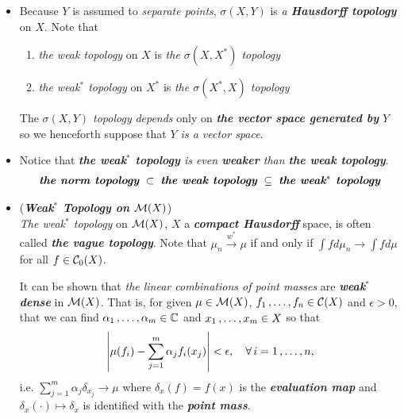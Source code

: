 \documentclass[11pt]{article}
\begin{document}
\begin{itemize}
\item \begin{remark}
Because $Y$ is assumed to \emph{separate points}, $\sigma(X, Y)$ is \emph{a \textbf{Hausdorff topology}} on $X$.  Note that
\begin{enumerate}
\item \emph{the weak topology} on $X$ is \emph{the $\sigma(X, X^{*})$ topology}
\item \emph{the weak$^{*}$ topology} on $X^{*}$ is \emph{the $\sigma(X^{*}, X)$ topology}
\end{enumerate}

The \emph{$\sigma(X, Y)$ topology} \emph{depends} only on \emph{\textbf{the vector space generated by }$Y$} so we henceforth suppose  that  \emph{$Y$ is a vector space}. 
\end{remark}


\item \begin{remark}
Notice that \emph{\textbf{the weak$^{*}$ topology} is even \textbf{weaker} than \textbf{the weak topology}}.
\begin{align*}
 \text{\emph{\textbf{the norm topology}}} \; \subset \; \text{\emph{\textbf{the weak topology}}} \; \subseteq \; \text{\emph{\textbf{the weak$^{*}$ topology}}}
\end{align*}
\end{remark}



\item \begin{example} (\emph{\textbf{Weak$^{*}$ Topology on ${\mathcal M}(X)$}})\\
\emph{The weak$^{*}$ topology} on ${\mathcal M}(X)$, $X$ a \emph{\textbf{compact Hausdorff}} space, is often called \emph{\textbf{the vague topology}}. Note that $\mu_n \stackrel{w^{*}}{\rightarrow} \mu$ if and only if $\int f d\mu_n \rightarrow \int f d\mu$ for all $f \in {\mathcal C}_0(X)$.

It can be shown that \emph{the linear combinations of point masses} are \emph{\textbf{weak$^{*}$ dense}} in  ${\mathcal M}(X)$. That is, for given $\mu \in {\mathcal M}(X)$,  $f_1 \,{,}\ldots{,}\, f_n \in {\mathcal C}(X)$ and $\epsilon > 0$, that we can find $\alpha_1 \,{,}\ldots{,}\, \alpha_m \in {\mathbb C}$ and $x_1 \,{,}\ldots{,}\, x_m \in X$ so that 
\begin{align*}
\left\lvert \mu(f_i) - \sum_{j=1}^{m}\alpha_j f_{i}(x_j)  \right\rvert < \epsilon, \quad \forall\, i=1 \,{,}\ldots{,}\, n,
\end{align*} i.e. $\sum_{j=1}^{m}\alpha_j \delta_{x_j} \rightarrow \mu$ where $\delta_x(f) = f(x)$ is the \emph{\textbf{evaluation map}} and $\delta_x(\cdot) \mapsto \delta_x$ is identified with the \emph{\textbf{point mass}}.
\end{example}



\end{itemize}
\end{document}
